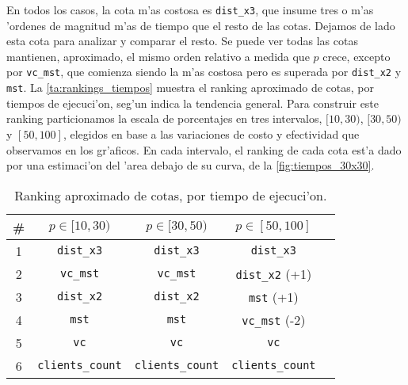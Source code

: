 En todos los casos, la cota m'as costosa es \texttt{dist\_x3}, que insume tres o m'as 'ordenes de magnitud m'as de tiempo que el resto de las cotas. Dejamos de lado esta cota para analizar y comparar el resto. Se puede ver todas las cotas mantienen, aproximado, el mismo orden relativo a medida que $p$ crece, excepto por \texttt{vc\_mst}, que comienza siendo la m'as costosa pero es superada por \texttt{dist\_x2} y \texttt{mst}. La \autoref{ta:rankings_tiempos} muestra el ranking aproximado de cotas, por tiempos de ejecuci'on, seg'un indica la tendencia general. Para construir este ranking particionamos la escala de porcentajes en tres intervalos, $[10, 30)$, $[30, 50)$ y $[50, 100]$, elegidos en base a las variaciones de costo y efectividad que observamos en los gr'aficos. En cada intervalo, el ranking de cada cota est'a dado por una estimaci'on del 'area debajo de su curva, de la \autoref{fig:tiempos_30x30}.

\begin{table}[h]
\begin{center}
\begin{tabular}{|c|c|c|c|c|}
\hline
\# & $p \in [10, 30)$ & $p \in [30, 50)$ & $p \in [50, 100]$\\
\hline
1 & \texttt{dist\_x3} & \texttt{dist\_x3} & \texttt{dist\_x3}\\
2 & \texttt{vc\_mst} & \texttt{vc\_mst} & \texttt{dist\_x2} (+1)\\
3 & \texttt{dist\_x2} & \texttt{dist\_x2} & \texttt{mst} (+1)\\
4 & \texttt{mst} & \texttt{mst} & \texttt{vc\_mst} (-2)\\
5 & \texttt{vc} & \texttt{vc} & \texttt{vc}\\
6 & \texttt{clients\_count} & \texttt{clients\_count} & \texttt{clients\_count}\\
\hline
\end{tabular}
\end{center}
\caption{Ranking aproximado de cotas, por tiempo de ejecuci'on.}
\label{ta:rankings_tiempos}
\end{table}

